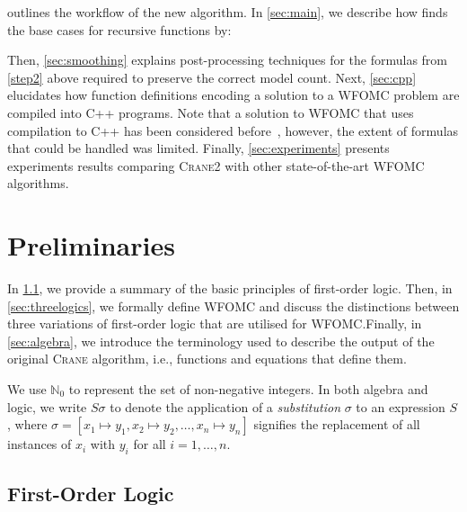 \documentclass[letterpaper]{article} %
\theoremstyle{remark}
\theoremstyle{definition}
\newcommand{\Cranetwo}{\textsc{Crane2}}
\begin{document}
 outlines the workflow of the new algorithm. In
\cref{sec:main}, we describe how \CompileWithBaseCases finds the base cases for
recursive functions by:
Then, \cref{sec:smoothing} explains post-processing techniques for the formulas
from \cref{step2} above required to preserve the correct model count. Next,
\cref{sec:cpp} elucidates how function definitions encoding a solution to a
WFOMC problem are compiled into C++ programs. Note that a solution to WFOMC that
uses compilation to C++ has been considered
before~\cite{DBLP:conf/kr/KazemiP16}, however, the extent of formulas that could
be handled was limited. Finally, \cref{sec:experiments} presents experiments
results comparing \Cranetwo{} with other state-of-the-art WFOMC algorithms.

\section{Preliminaries}

In \cref{sec:logic}, we provide a summary of the basic principles of first-order
logic. Then, in \cref{sec:threelogics}, we formally define WFOMC and discuss the
distinctions between three variations of first-order logic that are utilised for
WFOMC.\@ Finally, in \cref{sec:algebra}, we introduce the terminology used to
describe the output of the original \textsc{Crane} algorithm, i.e., functions
and equations that define them.

We use $\mathbb{N}_{0}$ to represent the set of non-negative integers. In both
algebra and logic, we write $S\sigma$ to denote the application of a
\emph{substitution} $\sigma$ to an expression $S$, where
$\sigma = [x_{1} \mapsto y_{1}, x_{2} \mapsto y_{2}, \dots, x_{n} \mapsto y_{n}]$
signifies the replacement of all instances of $x_{i}$ with $y_{i}$ for all
$i = 1, \dots, n$.

\subsection{First-Order Logic}\label{sec:logic}
\end{document}
